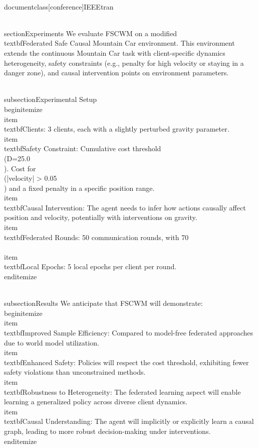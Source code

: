 \\documentclass[conference]{IEEEtran}
\begin{document}
\\section{Experiments}
We evaluate FSCWM on a modified \\textbf{Federated Safe Causal Mountain Car} environment. This environment extends the continuous Mountain Car task with client-specific dynamics heterogeneity, safety constraints (e.g., penalty for high velocity or staying in a danger zone), and causal intervention points on environment parameters.

\\subsection{Experimental Setup}
\\begin{itemize}
    \\item \\textbf{Clients}: 3 clients, each with a slightly perturbed gravity parameter.
    \\item \\textbf{Safety Constraint}: Cumulative cost threshold \\(D=25.0\\). Cost for \\(|velocity| > 0.05\\) and a fixed penalty in a specific position range.
    \\item \\textbf{Causal Intervention}: The agent needs to infer how actions causally affect position and velocity, potentially with interventions on gravity.
    \\item \\textbf{Federated Rounds}: 50 communication rounds, with 70\\%
    \\item \\textbf{Local Epochs}: 5 local epochs per client per round.
\\end{itemize}

\\subsection{Results}
We anticipate that FSCWM will demonstrate:
\\begin{itemize}
    \\item \\textbf{Improved Sample Efficiency}: Compared to model-free federated approaches due to world model utilization.
    \\item \\textbf{Enhanced Safety}: Policies will respect the cost threshold, exhibiting fewer safety violations than unconstrained methods.
    \\item \\textbf{Robustness to Heterogeneity}: The federated learning aspect will enable learning a generalized policy across diverse client dynamics.
    \\item \\textbf{Causal Understanding}: The agent will implicitly or explicitly learn a causal graph, leading to more robust decision-making under interventions.
\\end{itemize}
\end{document}

